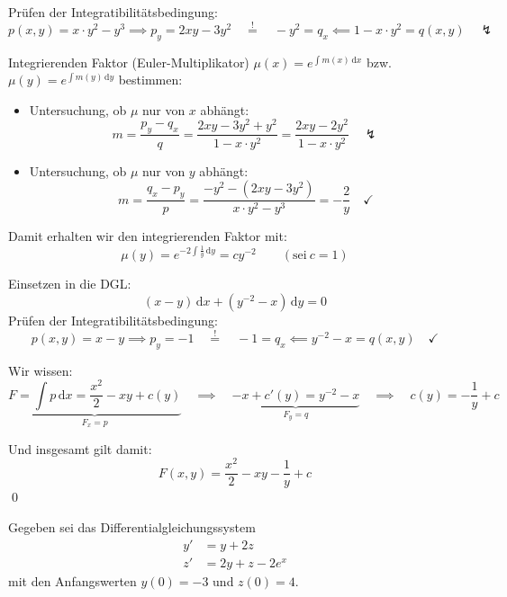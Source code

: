 \documentclass[answers]{exam}
\newcommand{\seq}{\overset{!}{=}}
\renewcommand{\d}{\,\mathrm{d}}
\begin{document}
\begin{questions}
\begin{solution}
        Prüfen der Integratibilitätsbedingung:
        $$
            p(x, y) = x \cdot y^2 - y^3 \implies p_y = 2xy -3y^2 \quad \seq \quad -y^2 = q_x \impliedby 1-x \cdot y^2 = q(x, y) \quad \lightning
        $$

        Integrierenden Faktor (Euler-Multiplikator) $\mu(x) = e^{\int m(x) \d x}$ bzw. $\mu(y) = e^{\int m(y) \d y}$ bestimmen:
        \begin{itemize}
            \item Untersuchung, ob $\mu$ nur von $x$ abhängt:
                  $$
                      m = \frac{p_y - q_x}{q} = \frac{2xy -3y^2 + y^2}{1-x \cdot y^2} = \frac{2xy -2y^2}{1-x \cdot y^2} \quad \lightning
                  $$
            \item Untersuchung, ob $\mu$ nur von $y$ abhängt:
                  $$
                      m = \frac{q_x - p_y}{p} = \frac{-y^2 - \left( 2xy -3y^2\right)}{x \cdot y^2 - y^3} = -\frac{2}{y} \quad \checkmark
                  $$
        \end{itemize}

        Damit erhalten wir den integrierenden Faktor mit:
        $$
            \mu(y) = e^{-2\int \frac{1}{y} \d y} = cy^{-2} \qquad (\text{sei} \ c = 1)
        $$

        Einsetzen in die DGL:
        $$
            (x - y) \d x + (y^{-2}-x ) \d y = 0
        $$
        Prüfen der Integratibilitätsbedingung:
        $$
            p(x, y) = x - y \implies p_y = -1 \quad \seq \quad -1 = q_x \impliedby y^{-2}-x = q(x, y) \quad \checkmark
        $$

        Wir wissen:
        $$
            \underbrace{F = \int p \d x = \frac{x^2}{2} - xy + c(y)}_{F_x = p} \quad \implies \quad \underbrace{-x + c'(y) = y^{-2}-x}_{F_y = q} \quad \implies \quad c(y) = -\frac{1}{y} + c
        $$

        Und insgesamt gilt damit:
        $$
            F(x, y) = \frac{x^2}{2} - xy - \frac{1}{y} + c
        $$\qed
    \end{solution}

    \newpage
    \question
    Gegeben sei das Differentialgleichungssystem
    $$
        \begin{aligned}
            y' & = y + 2z          \\
            z' & = 2y + z - 2e^{x}
        \end{aligned}
    $$
    mit den Anfangswerten $y(0) = -3$ und $z(0) = 4$.


\end{questions}
\end{document}
